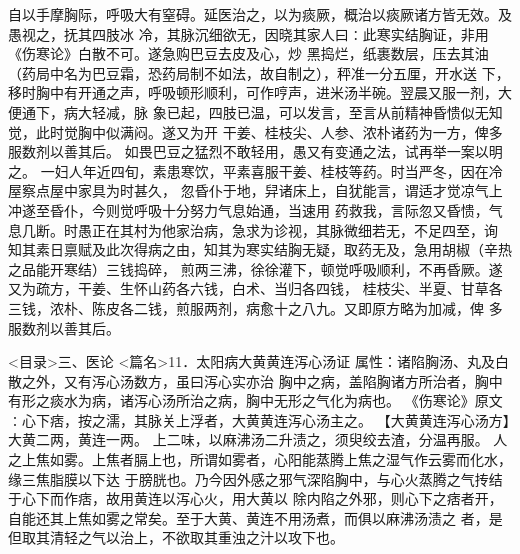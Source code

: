 \documentclass[a4paper,12pt,UTF8,twoside]{ctexbook}
\begin{document}
自以手摩胸际，呼吸大有窒碍。延医治之，以为痰厥，概治以痰厥诸方皆无效。及愚视之，抚其四肢冰 
冷，其脉沉细欲无，因晓其家人曰∶此寒实结胸证，非用《伤寒论》白散不可。遂急购巴豆去皮及心，炒 
黑捣烂，纸裹数层，压去其油（药局中名为巴豆霜，恐药局制不如法，故自制之），秤准一分五厘，开水送 
下，移时胸中有开通之声，呼吸顿形顺利，可作哼声，进米汤半碗。翌晨又服一剂，大便通下，病大轻减，脉 
象已起，四肢已温，可以发言，至言从前精神昏愦似无知觉，此时觉胸中似满闷。遂又为开 
干姜、桂枝尖、人参、浓朴诸药为一方，俾多服数剂以善其后。 
如畏巴豆之猛烈不敢轻用，愚又有变通之法，试再举一案以明之。 
一妇人年近四旬，素患寒饮，平素喜服干姜、桂枝等药。时当严冬，因在冷屋察点屋中家具为时甚久， 
忽昏仆于地，舁诸床上，自犹能言，谓适才觉凉气上冲遂至昏仆，今则觉呼吸十分努力气息始通，当速用 
药救我，言际忽又昏愦，气息几断。时愚正在其村为他家治病，急求为诊视，其脉微细若无，不足四至，询 
知其素日禀赋及此次得病之由，知其为寒实结胸无疑，取药无及，急用胡椒（辛热之品能开寒结）三钱捣碎， 
煎两三沸，徐徐灌下，顿觉呼吸顺利，不再昏厥。遂又为疏方，干姜、生怀山药各六钱，白术、当归各四钱， 
桂枝尖、半夏、甘草各三钱，浓朴、陈皮各二钱，煎服两剂，病愈十之八九。又即原方略为加减，俾 
多服数剂以善其后。 

<目录>三、医论
<篇名>11．太阳病大黄黄连泻心汤证
属性：诸陷胸汤、丸及白散之外，又有泻心汤数方，虽曰泻心实亦治 
胸中之病，盖陷胸诸方所治者，胸中有形之痰水为病，诸泻心汤所治之病，胸中无形之气化为病也。 
《伤寒论》原文∶心下痞，按之濡，其脉关上浮者，大黄黄连泻心汤主之。 
【大黄黄连泻心汤方】大黄二两，黄连一两。 
上二味，以麻沸汤二升渍之，须臾绞去渣，分温再服。 
人之上焦如雾。上焦者膈上也，所谓如雾者，心阳能蒸腾上焦之湿气作云雾而化水，缘三焦脂膜以下达 
于膀胱也。乃今因外感之邪气深陷胸中，与心火蒸腾之气抟结于心下而作痞，故用黄连以泻心火，用大黄以 
除内陷之外邪，则心下之痞者开，自能还其上焦如雾之常矣。至于大黄、黄连不用汤煮，而俱以麻沸汤渍之 
者，是但取其清轻之气以治上，不欲取其重浊之汁以攻下也。 
\end{document}
